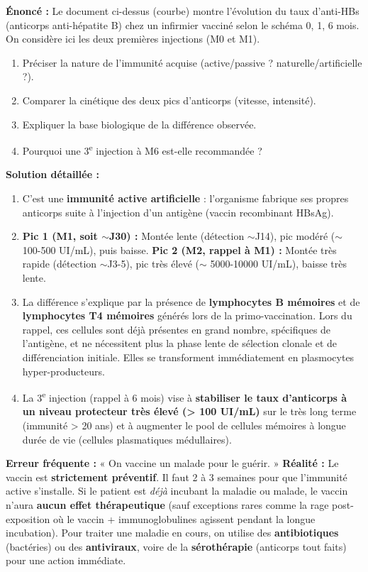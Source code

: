 \documentclass[11pt]{article}
\begin{document}
\begin{exoresolu}
\textbf{Énoncé :} Le document ci-dessus (courbe) montre l'évolution du taux d'anti-HBs (anticorps anti-hépatite B) chez un infirmier vacciné selon le schéma 0, 1, 6 mois. On considère ici les deux premières injections (M0 et M1).
\begin{enumerate}
    \item Préciser la nature de l'immunité acquise (active/passive ? naturelle/artificielle ?).
    \item Comparer la cinétique des deux pics d'anticorps (vitesse, intensité).
    \item Expliquer la base biologique de la différence observée.
    \item Pourquoi une 3\textsuperscript{e} injection à M6 est-elle recommandée ?
\end{enumerate}
\tcblower
\textbf{Solution détaillée :}
\begin{enumerate}
    \item C'est une \textbf{immunité active artificielle} : l'organisme fabrique ses propres anticorps suite à l'injection d'un antigène (vaccin recombinant HBsAg).
    \item \textbf{Pic 1 (M1, soit $\sim$J30) :} Montée lente (détection $\sim$J14), pic modéré ($\sim$ 100-500 UI/mL), puis baisse. \textbf{Pic 2 (M2, rappel à M1) :} Montée très rapide (détection $\sim$J3-5), pic très élevé ($\sim$ 5000-10000 UI/mL), baisse très lente.
    \item La différence s'explique par la présence de \textbf{lymphocytes B mémoires} et de \textbf{lymphocytes T4 mémoires} générés lors de la primo-vaccination. Lors du rappel, ces cellules sont déjà présentes en grand nombre, spécifiques de l'antigène, et ne nécessitent plus la phase lente de sélection clonale et de différenciation initiale. Elles se transforment immédiatement en plasmocytes hyper-producteurs.
    \item La 3\textsuperscript{e} injection (rappel à 6 mois) vise à \textbf{stabiliser le taux d'anticorps à un niveau protecteur très élevé (> 100 UI/mL)} sur le très long terme (immunité > 20 ans) et à augmenter le pool de cellules mémoires à longue durée de vie (cellules plasmatiques médullaires).
\end{enumerate}
\end{exoresolu}

\begin{attention}
\textbf{Erreur fréquente :} « On vaccine un malade pour le guérir. »
\textbf{Réalité :} Le vaccin est \textbf{strictement préventif}. Il faut 2 à 3 semaines pour que l'immunité active s'installe. Si le patient est \emph{déjà} incubant la maladie ou malade, le vaccin n'aura \textbf{aucun effet thérapeutique} (sauf exceptions rares comme la rage post-exposition où le vaccin + immunoglobulines agissent pendant la longue incubation). Pour traiter une maladie en cours, on utilise des \textbf{antibiotiques} (bactéries) ou des \textbf{antiviraux}, voire de la \textbf{sérothérapie} (anticorps tout faits) pour une action immédiate.
\end{attention}
\end{document}
